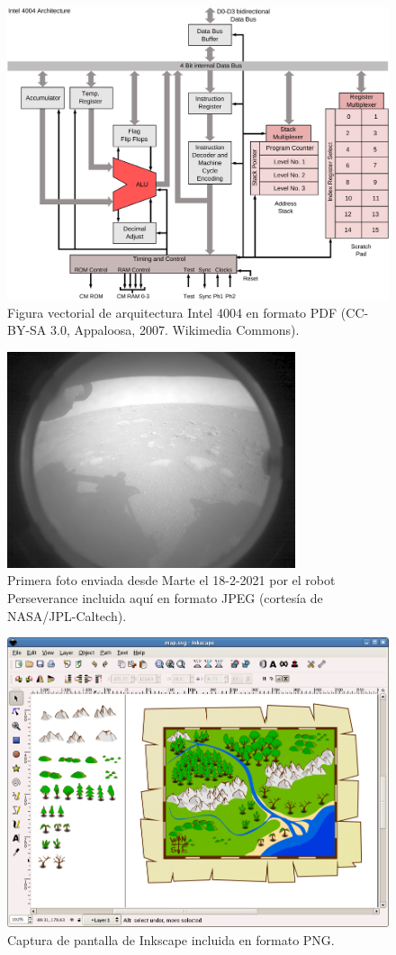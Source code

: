 \documentclass[11pt,a4paper]{article}
\begin{document}
\begin{figure}[hbt]
	\centering 
	\includegraphics[width=0.8\linewidth]{4004arch} 
	\caption[Ejemplo de gráfico vectorial \textsf{PDF}]{Figura vectorial de arquitectura Intel 4004 en formato \textsf{PDF} (CC-BY-SA 3.0, Appaloosa, 2007. Wikimedia Commons).}
	\label{fig:4004arch}
\end{figure}

\begin{figure}[hbt]
	\centering
	\includegraphics[width=0.5\linewidth]{Mars_Perseverance} 
	\caption[Foto histórica enviada desde Marte]{Primera foto enviada desde Marte el {18-2-2021} por el robot Perseverance incluida aquí en formato JPEG (cortesía de NASA/JPL-Caltech).}
	\label{fig:mars}
\end{figure}

\begin{figure}[hbt]
	\centering
	\includegraphics[width=0.7\linewidth]{inkscape} 
	\caption[Ejemplo de captura en png]{Captura de pantalla de \textsf{Inkscape} incluida en formato \textsf{PNG}.}
	\label{fig:inkscape}
\end{figure}
\end{document}
